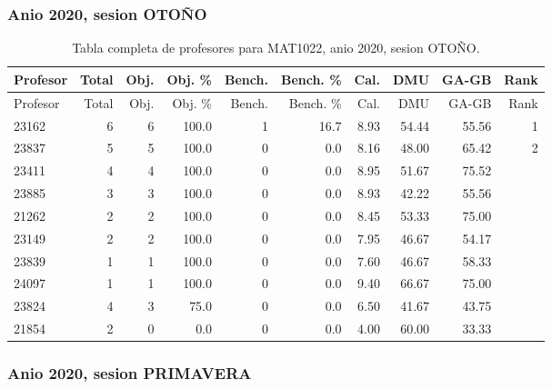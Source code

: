 \subsubsection{Anio 2020, sesion OTOÑO}

\begingroup
\scriptsize
\setlength{\tabcolsep}{3pt}
\begin{longtable}{lrrrrrrrrr}
\caption{Tabla completa de profesores para MAT1022, anio 2020, sesion OTOÑO.}\label{tab:prof-period-mat1022-2020-oto-o-especializado}\\
\toprule
Profesor & Total & Obj. & Obj. \% & Bench. & Bench. \% & Cal. & DMU & GA-GB & Rank \\
\midrule
\endfirsthead
\toprule
Profesor & Total & Obj. & Obj. \% & Bench. & Bench. \% & Cal. & DMU & GA-GB & Rank \\
\midrule
\endhead
23162 & 6 & 6 & 100.0 & 1 & 16.7 & 8.93 & 54.44 & 55.56 & 1 \\
23837 & 5 & 5 & 100.0 & 0 & 0.0 & 8.16 & 48.00 & 65.42 & 2 \\
23411 & 4 & 4 & 100.0 & 0 & 0.0 & 8.95 & 51.67 & 75.52 &  \\
23885 & 3 & 3 & 100.0 & 0 & 0.0 & 8.93 & 42.22 & 55.56 &  \\
21262 & 2 & 2 & 100.0 & 0 & 0.0 & 8.45 & 53.33 & 75.00 &  \\
23149 & 2 & 2 & 100.0 & 0 & 0.0 & 7.95 & 46.67 & 54.17 &  \\
23839 & 1 & 1 & 100.0 & 0 & 0.0 & 7.60 & 46.67 & 58.33 &  \\
24097 & 1 & 1 & 100.0 & 0 & 0.0 & 9.40 & 66.67 & 75.00 &  \\
23824 & 4 & 3 & 75.0 & 0 & 0.0 & 6.50 & 41.67 & 43.75 &  \\
21854 & 2 & 0 & 0.0 & 0 & 0.0 & 4.00 & 60.00 & 33.33 &  \\
\bottomrule
\end{longtable}
\endgroup

\subsubsection{Anio 2020, sesion PRIMAVERA}

